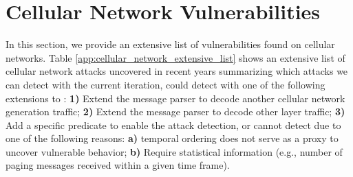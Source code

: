 \section{Cellular Network Vulnerabilities}
\label{appendix:attack-list}
In this section, we provide an extensive list of vulnerabilities found on cellular
networks. Table \ref{app:cellular_network_extensive_list} shows an extensive list
of cellular network attacks uncovered in recent years summarizing which attacks
we can detect with the current iteration, could detect with one of the following
extensions to \system: \textbf{1)} Extend the message parser to decode another
cellular network generation traffic; \textbf{2)} Extend the message parser to
decode other layer traffic; \textbf{3)} Add a specific predicate to enable
the attack detection, or cannot detect due to one of the following reasons: \textbf{a)}
temporal ordering does not serve as a proxy to uncover vulnerable behavior;
\textbf{b)} Require statistical information (e.g., number of paging messages
received within a given time frame).

